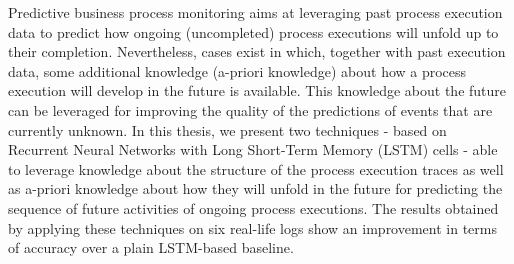 Predictive business process monitoring aims at leveraging past process execution data to predict how ongoing (uncompleted) process executions will unfold up to
their completion.
Nevertheless, cases exist in which, together with past
execution data, some additional knowledge (a-priori
knowledge) about how a process execution will develop in the future is available. This knowledge about the future can be leveraged for
improving the quality of the predictions of events that are currently unknown. In this thesis, we present two
techniques - based on Recurrent Neural Networks with Long Short-Term Memory (LSTM) cells - able to
leverage knowledge about the structure of the process execution traces as well as a-priori knowledge about how they will unfold in the future for predicting the sequence of future activities of ongoing process executions. The results obtained by applying these techniques on six real-life logs show an improvement in terms of accuracy over a plain
LSTM-based baseline.

